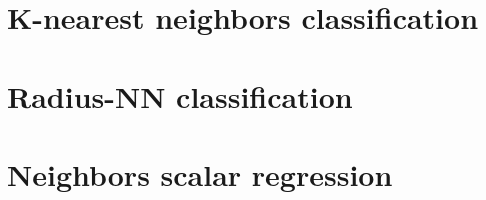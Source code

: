 

























\section{K-nearest neighbors classification\label{EX:KNN}}
\section{Radius-NN classification\label{EX:RNN}}
\section{Neighbors scalar regression\label{EX:SCALARREG}}